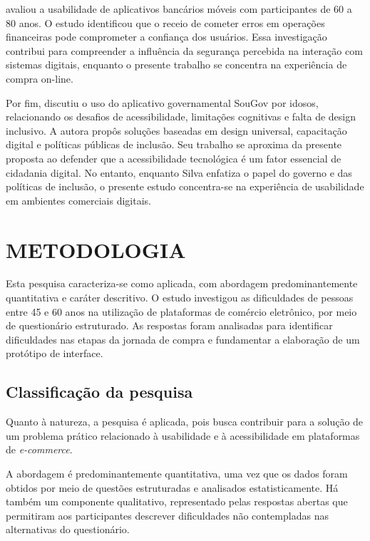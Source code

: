 \documentclass[12pt,a4paper]{article}
\begin{document}
 avaliou a usabilidade de aplicativos bancários móveis com participantes de 60 a 80 anos. O estudo identificou que o receio de cometer erros em operações financeiras pode comprometer a confiança dos usuários. Essa investigação contribui para compreender a influência da segurança percebida na interação com sistemas digitais, enquanto o presente trabalho se concentra na experiência de compra on-line.

Por fim,  discutiu o uso do aplicativo governamental SouGov por idosos, relacionando os desafios de acessibilidade, limitações cognitivas e falta de design inclusivo. A autora propôs soluções baseadas em design universal, capacitação digital e políticas públicas de inclusão. Seu trabalho se aproxima da presente proposta ao defender que a acessibilidade tecnológica é um fator essencial de cidadania digital. No entanto, enquanto Silva enfatiza o papel do governo e das políticas de inclusão, o presente estudo concentra-se na experiência de usabilidade em ambientes comerciais digitais.

\section{METODOLOGIA}

Esta pesquisa caracteriza-se como aplicada, com abordagem predominantemente quantitativa e caráter descritivo. O estudo investigou as dificuldades de pessoas entre 45 e 60 anos na utilização de plataformas de comércio eletrônico, por meio de questionário estruturado. As respostas foram analisadas para identificar dificuldades nas etapas da jornada de compra e fundamentar a elaboração de um protótipo de interface.

\subsection{Classificação da pesquisa}

Quanto à natureza, a pesquisa é aplicada, pois busca contribuir para a solução de um problema prático relacionado à usabilidade e à acessibilidade em plataformas de \textit{e-commerce}.

A abordagem é predominantemente quantitativa, uma vez que os dados foram obtidos por meio de questões estruturadas e analisados estatisticamente. Há também um componente qualitativo, representado pelas respostas abertas que permitiram aos participantes descrever dificuldades não contempladas nas alternativas do questionário.
\end{document}
